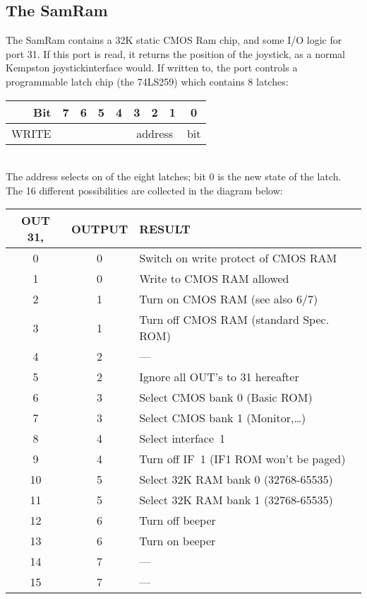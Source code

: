 \subsection{The SamRam}

    The SamRam contains a 32K static CMOS Ram chip, and some I/O logic for
    port 31.  If this port is read, it returns the position of the joystick,
    as a normal Kempston joystickinterface would.  If written to, the port
    controls a programmable latch chip (the 74LS259) which contains 8
    latches:\\

\begin{tabular}{|r||c|c|c|c|c|c|c|c|}
  \hline
    Bit   & 7 & 6 & 5 & 4 &         3 & 2 & 1        & 0\\
  \hline
    WRITE &   &   &   &   & \multicolumn{3}{c|}{address} & bit\\
  \hline
\end{tabular}\\

\noindent
    The address selects on of the eight latches; bit 0 is the new state of
    the latch.  The 16 different possibilities are collected in the diagram
    below:\\

\begin{tabular}{|c|c|l|}
  \hline
    OUT 31, & OUTPUT & RESULT\\
  \hline
  \hline
       0    &    0    & Switch on write protect of CMOS RAM\\
       1    &    0    & Write to CMOS RAM allowed\\
       2    &    1    & Turn on CMOS RAM (see also 6/7)\\
       3    &    1    & Turn off CMOS RAM (standard Spec. ROM)\\
       4    &    2    & ---\\
       5    &    2    & Ignore all OUT's to 31 hereafter\\
       6    &    3    & Select CMOS bank 0 (Basic ROM)\\
       7    &    3    & Select CMOS bank 1 (Monitor,\ldots)\\
       8    &    4    & Select interface~1\\
       9    &    4    & Turn off IF~1 (IF1 ROM won't be paged)\\
      10    &    5    & Select 32K RAM bank 0 (32768-65535)\\
      11    &    5    & Select 32K RAM bank 1 (32768-65535)\\
      12    &    6    & Turn off beeper\\
      13    &    6    & Turn on beeper\\
      14    &    7    & ---\\
      15    &    7    & ---\\
  \hline
\end{tabular}\\

